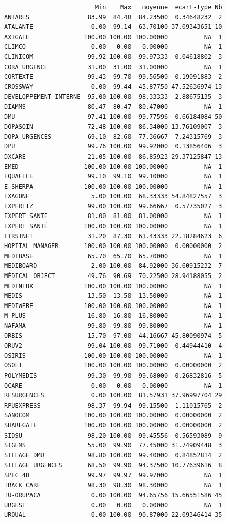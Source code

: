 \documentclass[]{article}
\begin{document}
\begin{verbatim}
                         Min    Max   moyenne  ecart-type Nb
ANTARES                83.99  84.48  84.23500  0.34648232  2
ATALANTE                0.00  99.14  63.70100 37.09343651 10
AXIGATE               100.00 100.00 100.00000          NA  1
CLIMCO                  0.00   0.00   0.00000          NA  1
CLINICOM               99.92 100.00  99.97333  0.04618802  3
CORA URGENCE           31.00  31.00  31.00000          NA  1
CORTEXTE               99.43  99.70  99.56500  0.19091883  2
CROSSWAY                0.00  99.44  45.87750 47.52636974 13
DEVELOPPEMENT INTERNE  95.00 100.00  98.33333  2.88675135  3
DIAMMS                 80.47  80.47  80.47000          NA  1
DMU                    97.41 100.00  99.77596  0.66184084 50
DOPASOIN               72.48 100.00  86.34000 13.76109007  3
DOPA URGENCES          69.10  82.60  77.36667  7.24315769  3
DPU                    99.76 100.00  99.92000  0.13856406  3
DXCARE                 21.05 100.00  86.85923 29.37125847 13
EMED                  100.00 100.00 100.00000          NA  1
EQUAFILE               99.10  99.10  99.10000          NA  1
E SHERPA              100.00 100.00 100.00000          NA  1
EXAGONE                 5.00 100.00  68.33333 54.84827557  3
EXPERTIZ               99.00 100.00  99.66667  0.57735027  3
EXPERT SANTE           81.00  81.00  81.00000          NA  1
EXPERT SANTÉ          100.00 100.00 100.00000          NA  1
FIRSTNET               31.20  87.30  61.43333 22.18284623  6
HOPITAL MANAGER       100.00 100.00 100.00000  0.00000000  2
MEDIBASE               65.70  65.70  65.70000          NA  1
MEDIBOARD               2.00 100.00  84.92000 36.60915232  7
MÉDICAL OBJECT         49.76  90.69  70.22500 28.94188055  2
MEDINTUX              100.00 100.00 100.00000          NA  1
MEDIS                  13.50  13.50  13.50000          NA  1
MEDIWERE              100.00 100.00 100.00000          NA  1
M-PLUS                 16.80  16.80  16.80000          NA  1
NAFAMA                 99.80  99.80  99.80000          NA  1
ORBIS                  15.70  97.00  44.16667 45.80090974  5
ORUV2                  99.04 100.00  99.71000  0.44944410  4
OSIRIS                100.00 100.00 100.00000          NA  1
OSOFT                 100.00 100.00 100.00000  0.00000000  2
POLYMEDIS              99.30  99.90  99.68000  0.26832816  5
QCARE                   0.00   0.00   0.00000          NA  1
RESURGENCES             0.00 100.00  81.57931 37.96997704 29
RPUEXPRESS             98.37  99.94  99.15500  1.11015765  2
SANOCOM               100.00 100.00 100.00000  0.00000000  2
SHAREGATE             100.00 100.00 100.00000  0.00000000  2
SIDSU                  98.20 100.00  99.45556  0.56593089  9
SIGEMS                 55.00  99.90  77.45000 31.74909448  3
SILLAGE DMU            98.80 100.00  99.40000  0.84852814  2
SILLAGE URGENCES       68.50  99.90  94.37500 10.77639616  8
SPEC 4D                99.97  99.97  99.97000          NA  1
TRACK CARE             98.30  98.30  98.30000          NA  1
TU-ORUPACA              0.00 100.00  94.65756 15.66551586 45
URGEST                  0.00   0.00   0.00000          NA  1
URQUAL                  0.00 100.00  90.87000 22.09346414 35
\end{verbatim}
\end{document}
